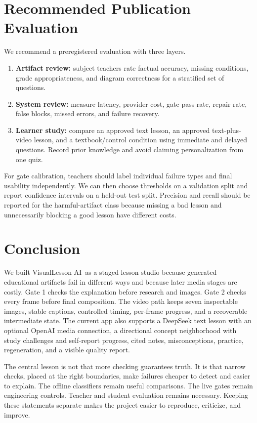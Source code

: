 \documentclass[11pt]{article}
\newcommand{\product}{VisualLesson AI}
\theoremstyle{plain}
\theoremstyle{definition}
\begin{document}
\section{Recommended Publication Evaluation}

We recommend a preregistered evaluation with three layers.
\begin{enumerate}
  \item \textbf{Artifact review:} subject teachers rate factual accuracy, missing conditions, grade appropriateness, and diagram correctness for a stratified set of questions.
  \item \textbf{System review:} measure latency, provider cost, gate pass rate, repair rate, false blocks, missed errors, and failure recovery.
  \item \textbf{Learner study:} compare an approved text lesson, an approved text-plus-video lesson, and a textbook/control condition using immediate and delayed questions. Record prior knowledge and avoid claiming personalization from one quiz.
\end{enumerate}

For gate calibration, teachers should label individual failure types and final usability independently. We can then choose thresholds on a validation split and report confidence intervals on a held-out test split. Precision and recall should be reported for the harmful-artifact class because missing a bad lesson and unnecessarily blocking a good lesson have different costs.

\section{Conclusion}

We built \product\ as a staged lesson studio because generated educational artifacts fail in different ways and because later media stages are costly. Gate 1 checks the explanation before research and images. Gate 2 checks every frame before final composition. The video path keeps seven inspectable images, stable captions, controlled timing, per-frame progress, and a recoverable intermediate state. The current app also supports a DeepSeek text lesson with an optional OpenAI media connection, a directional concept neighborhood with study challenges and self-report progress, cited notes, misconceptions, practice, regeneration, and a visible quality report.

The central lesson is not that more checking guarantees truth. It is that narrow checks, placed at the right boundaries, make failures cheaper to detect and easier to explain. The offline classifiers remain useful comparisons. The live gates remain engineering controls. Teacher and student evaluation remains necessary. Keeping these statements separate makes the project easier to reproduce, criticize, and improve.
\end{document}
